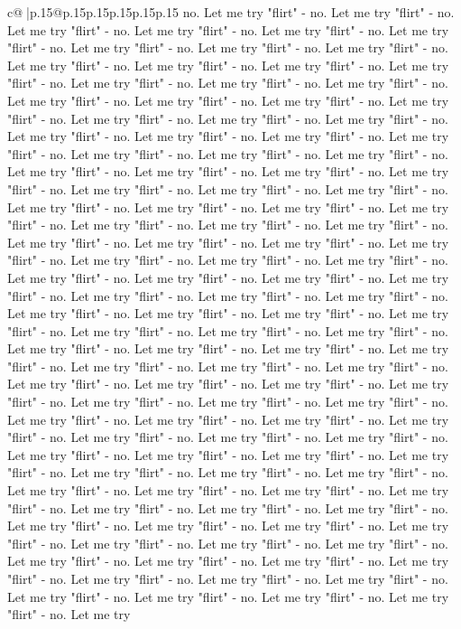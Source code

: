 \documentclass{article}
\begin{document}
{\begin{supertabular}{c@{$\;$}|p{.15\linewidth}@{}p{.15\linewidth}p{.15\linewidth}p{.15\linewidth}p{.15\linewidth}p{.15\linewidth}}
{{{no. Let me try "flirt" {-} no. Let me try "flirt" {-} no. Let me try "flirt" {-} no. Let me try "flirt" {-} no. Let me try "flirt" {-} no. Let me try "flirt" {-} no. Let me try "flirt" {-} no. Let me try "flirt" {-} no. Let me try "flirt" {-} no. Let me try "flirt" {-} no. Let me try "flirt" {-} no. Let me try "flirt" {-} no. Let me try "flirt" {-} no. Let me try "flirt" {-} no. Let me try "flirt" {-} no. Let me try "flirt" {-} no. Let me try "flirt" {-} no. Let me try "flirt" {-} no. Let me try "flirt" {-} no. Let me try "flirt" {-} no. Let me try "flirt" {-} no. Let me try "flirt" {-} no. Let me try "flirt" {-} no. Let me try "flirt" {-} no. Let me try "flirt" {-} no. Let me try "flirt" {-} no. Let me try "flirt" {-} no. Let me try "flirt" {-} no. Let me try "flirt" {-} no. Let me try "flirt" {-} no. Let me try "flirt" {-} no. Let me try "flirt" {-} no. Let me try "flirt" {-} no. Let me try "flirt" {-} no. Let me try "flirt" {-} no. Let me try "flirt" {-} no. Let me try "flirt" {-} no. Let me try "flirt" {-} no. Let me try "flirt" {-} no. Let me try "flirt" {-} no. Let me try "flirt" {-} no. Let me try "flirt" {-} no. Let me try "flirt" {-} no. Let me try "flirt" {-} no. Let me try "flirt" {-} no. Let me try "flirt" {-} no. Let me try "flirt" {-} no. Let me try "flirt" {-} no. Let me try "flirt" {-} no. Let me try "flirt" {-} no. Let me try "flirt" {-} no. Let me try "flirt" {-} no. Let me try "flirt" {-} no. Let me try "flirt" {-} no. Let me try "flirt" {-} no. Let me try "flirt" {-} no. Let me try "flirt" {-} no. Let me try "flirt" {-} no. Let me try "flirt" {-} no. Let me try "flirt" {-} no. Let me try "flirt" {-} no. Let me try "flirt" {-} no. Let me try "flirt" {-} no. Let me try "flirt" {-} no. Let me try "flirt" {-} no. Let me try "flirt" {-} no. Let me try "flirt" {-} no. Let me try "flirt" {-} no. Let me try "flirt" {-} no. Let me try "flirt" {-} no. Let me try "flirt" {-} no. Let me try "flirt" {-} no. Let me try "flirt" {-} no. Let me try "flirt" {-} no. Let me try "flirt" {-} no. Let me try "flirt" {-} no. Let me try "flirt" {-} no. Let me try "flirt" {-} no. Let me try "flirt" {-} no. Let me try "flirt" {-} no. Let me try "flirt" {-} no. Let me try "flirt" {-} no. Let me try "flirt" {-} no. Let me try "flirt" {-} no. Let me try "flirt" {-} no. Let me try "flirt" {-} no. Let me try "flirt" {-} no. Let me try "flirt" {-} no. Let me try "flirt" {-} no. Let me try "flirt" {-} no. Let me try "flirt" {-} no. Let me try "flirt" {-} no. Let me try "flirt" {-} no. Let me try "flirt" {-} no. Let me try "flirt" {-} no. Let me try "flirt" {-} no. Let me try "flirt" {-} no. Let me try "flirt" {-} no. Let me try "flirt" {-} no. Let me try "flirt" {-} no. Let me try "flirt" {-} no. Let me try "flirt" {-} no. Let me try "flirt" {-} no. Let me try "flirt" {-} no. Let me try "flirt" {-} no. Let me try "flirt" {-} no. Let me try "flirt" {-} no. Let me try "flirt" {-} no. Let me try "flirt" {-} no. Let me try "flirt" {-} no. Let me try "flirt" {-} no. Let me try "flirt" {-} no. Let me try "flirt" {-} no. Let me try "flirt" {-} no. Let me try "flirt" {-} no. Let me try "flirt" {-} no. Let me try "flirt" {-} no. Let me try "flirt" {-} no. Let me try }}}
\end{supertabular}}
\end{document}
